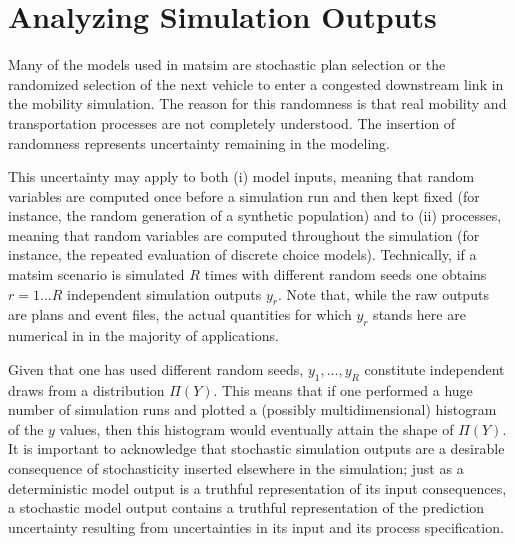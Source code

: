 \section{\label{sec:Statistical-analysis-of}Analyzing Simulation Outputs}

%

Many of the models used in \gls{matsim} are stochastic plan selection or the randomized selection of the next vehicle to enter a congested
downstream link in the mobility simulation. The reason for this randomness is
that real mobility and transportation processes are not completely understood.
The insertion of randomness represents  uncertainty remaining in the
modeling.

This uncertainty may apply to both (i) model inputs, meaning that
random variables are computed once before a simulation run and then
kept fixed (for instance, the random generation of a synthetic population)
and to (ii) processes, meaning that random variables are computed
throughout the simulation (for instance, the repeated evaluation of
discrete choice models). Technically, if a \gls{matsim} scenario is simulated
$R$ times\corr{,}{} with different random seeds\corr{,}{} one obtains $r=1\ldots
R$ independent simulation outputs $y_{r}$. Note that, while the raw outputs
are plans and event files, the actual quantities for which $y_{r}$
stands here are numerical in in the majority of applications.

Given that one has used different random seeds, $y_{1},\ldots,y_{R}$
constitute independent draws from a distribution $\Pi(Y)$. This means
that if one performed a huge number of simulation runs and plotted
a (possibly multidimensional) histogram of the $y$ values, then this
histogram would eventually attain the shape of $\Pi(Y)$. It is important
to acknowledge that stochastic simulation outputs are a desirable
consequence of stochasticity inserted elsewhere in the simulation;
just as a deterministic model output is a truthful representation
of its input consequences, a stochastic model output contains
a truthful representation of the prediction uncertainty resulting
from uncertainties in its input and its process specification.

